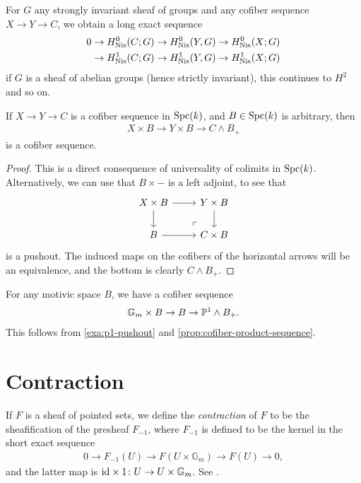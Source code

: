 \documentclass[11pt,openany]{book}
\let\smashprod\wedge
\begin{document}
\begin{proposition} For $G$ any strongly invariant sheaf of groups and any cofiber sequence $X \to Y \to C$, we obtain a long exact sequence
\begin{align*}
    0 \to H_{\mathrm{Nis}}^0(C;G) \to H^0_{\mathrm{Nis}}(Y,G) \to H^0_{\mathrm{Nis}}(X;G) \\
    \to  H_{\mathrm{Nis}}^1(C;G) \to H^1_{\mathrm{Nis}}(Y,G) \to H^1_{\mathrm{Nis}}(X;G)
\end{align*}
if $G$ is a sheaf of abelian groups (hence strictly invariant), this continues to $H^2$ and so on.
\end{proposition}

\begin{proposition}\label{prop:cofiber-product-sequence} 
If $X \to Y \to C$ is a cofiber sequence in $\mathrm{Spc}(k)$, and $B \in \mathrm{Spc}(k)$ is arbitrary, then
\begin{align*}
    X \times B \to Y \times B \to C \smashprod B_+
\end{align*}
is a cofiber sequence.
\end{proposition}
\begin{proof} This is a direct consequence of universality of colimits in $\mathrm{Spc}(k)$. Alternatively, we can use that $B \times -$ is a left adjoint, to see that
\[ \begin{tikzcd}
    X \times B\rar\dar & Y \times B\dar\\
    B\rar & C \times B\po
\end{tikzcd} \]
is a pushout. The induced maps on the cofibers of the horizontal arrows will be an equivalence, and the bottom is clearly $C \smashprod B_+$.
\end{proof}

%
\begin{example} For any motivic space $B$, we have a cofiber sequence
\begin{align*}
    \mathbb{G}_m \times B \to B \to \P^1 \smashprod B_+.
\end{align*}
This follows from \autoref{exa:p1-pushout} and \autoref{prop:cofiber-product-sequence}.
\end{example}


\section{Contraction}

\begin{definition} If $F$ is a sheaf of pointed sets, we define the \textit{contraction} of $F$ to be the sheafification of the presheaf $F_{-1}$, where $F_{-1}$ is defined to be the kernel in the short exact sequence
\begin{align*}
    0 \to F_{-1}(U) \to F(U \times \mathbb{G}_m) \to F(U) \to 0,
\end{align*}
and the latter map is $\mathrm{id} \times 1 \colon U \to U \times \mathbb{G}_m$. See \cite[2.1.10]{ABH-Freudenthal}.
\end{definition}
\end{document}
